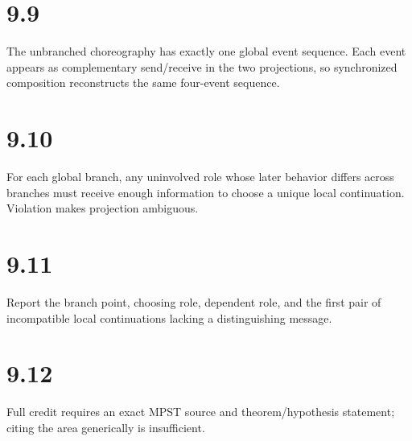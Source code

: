 \section*{9.9}
The unbranched choreography has exactly one global event sequence. Each event appears as complementary send/receive in the two projections, so synchronized composition reconstructs the same four-event sequence.

\section*{9.10}
For each global branch, any uninvolved role whose later behavior differs across branches must receive enough information to choose a unique local continuation. Violation makes projection ambiguous.

\section*{9.11}
Report the branch point, choosing role, dependent role, and the first pair of incompatible local continuations lacking a distinguishing message.

\section*{9.12}
Full credit requires an exact MPST source and theorem/hypothesis statement; citing the area generically is insufficient.

